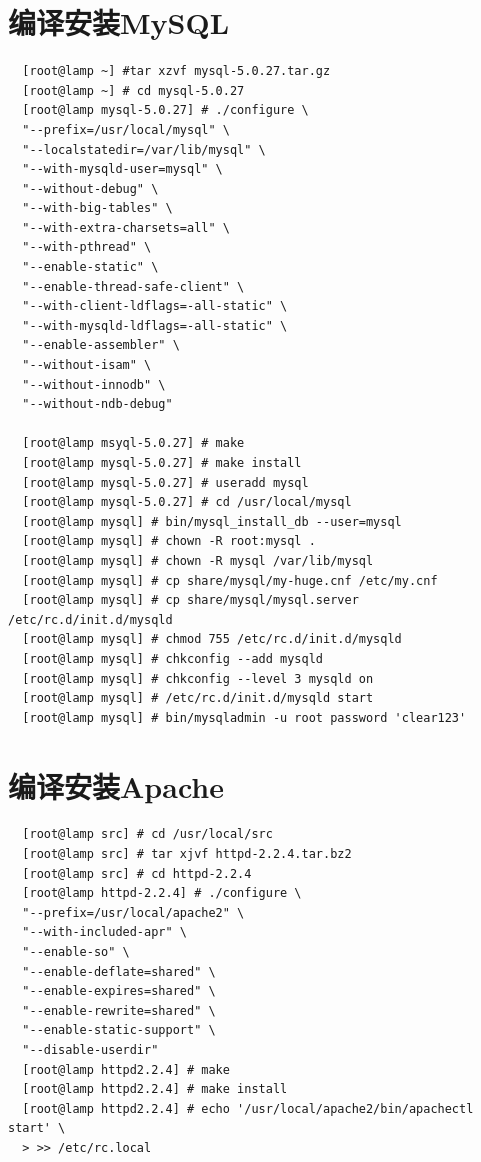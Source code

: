 \section{编译安装MySQL}

\small{
\begin{verbatim}
  [root@lamp ~] #tar xzvf mysql-5.0.27.tar.gz
  [root@lamp ~] # cd mysql-5.0.27
  [root@lamp mysql-5.0.27] # ./configure \
  "--prefix=/usr/local/mysql" \
  "--localstatedir=/var/lib/mysql" \
  "--with-mysqld-user=mysql" \
  "--without-debug" \
  "--with-big-tables" \
  "--with-extra-charsets=all" \
  "--with-pthread" \
  "--enable-static" \
  "--enable-thread-safe-client" \
  "--with-client-ldflags=-all-static" \
  "--with-mysqld-ldflags=-all-static" \
  "--enable-assembler" \
  "--without-isam" \
  "--without-innodb" \
  "--without-ndb-debug"
  
  [root@lamp msyql-5.0.27] # make
  [root@lamp mysql-5.0.27] # make install
  [root@lamp mysql-5.0.27] # useradd mysql
  [root@lamp mysql-5.0.27] # cd /usr/local/mysql
  [root@lamp mysql] # bin/mysql_install_db --user=mysql
  [root@lamp mysql] # chown -R root:mysql .
  [root@lamp mysql] # chown -R mysql /var/lib/mysql
  [root@lamp mysql] # cp share/mysql/my-huge.cnf /etc/my.cnf
  [root@lamp mysql] # cp share/mysql/mysql.server /etc/rc.d/init.d/mysqld
  [root@lamp mysql] # chmod 755 /etc/rc.d/init.d/mysqld
  [root@lamp mysql] # chkconfig --add mysqld
  [root@lamp mysql] # chkconfig --level 3 mysqld on
  [root@lamp mysql] # /etc/rc.d/init.d/mysqld start
  [root@lamp mysql] # bin/mysqladmin -u root password 'clear123'
\end{verbatim}
}
\normalsize

\section{编译安装Apache}

\small{
\begin{verbatim}
  [root@lamp src] # cd /usr/local/src
  [root@lamp src] # tar xjvf httpd-2.2.4.tar.bz2
  [root@lamp src] # cd httpd-2.2.4
  [root@lamp httpd-2.2.4] # ./configure \
  "--prefix=/usr/local/apache2" \
  "--with-included-apr" \
  "--enable-so" \
  "--enable-deflate=shared" \
  "--enable-expires=shared" \
  "--enable-rewrite=shared" \
  "--enable-static-support" \
  "--disable-userdir"
  [root@lamp httpd2.2.4] # make
  [root@lamp httpd2.2.4] # make install
  [root@lamp httpd2.2.4] # echo '/usr/local/apache2/bin/apachectl start' \
  > >> /etc/rc.local
\end{verbatim}
}
\normalsize

